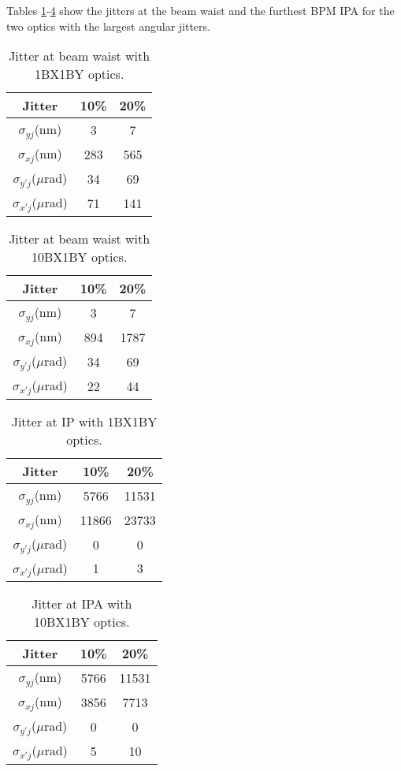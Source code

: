 Tables \ref{t-jitter1BX1BY}-\ref{t-jitter10BX1BY-IPA} show the jitters at the beam waist and the furthest BPM IPA for the two optics with the largest angular jitters.\par
\begin{table}[hbt]
\centering
 \begin{tabular}{|c|c|c|}\hline	
 Jitter &10\% & 20\%\\\hline
 $\sigma_{yj}$(nm) & 3  & 7\\\hline
 $\sigma_{xj}$(nm) &283&565 \\\hline
 $\sigma_{y'j}$($\mu$rad) &34&69\\\hline
 $\sigma_{x'j}$($\mu$rad) &71&141\\\hline
 \end{tabular}
 \caption{Jitter at beam waist with 1BX1BY optics.}\label{t-jitter1BX1BY}
\end{table}
\begin{table}[hbt]
\centering
 \begin{tabular}{|c|c|c|}\hline
 Jitter &10\% & 20\%\\\hline
 $\sigma_{yj}$(nm) & 3  & 7\\\hline
 $\sigma_{xj}$(nm) &894&1787 \\\hline
 $\sigma_{y'j}$($\mu$rad) &34&69\\\hline
 $\sigma_{x'j}$($\mu$rad) &22&44\\\hline
 \end{tabular}
 \caption{Jitter at beam waist with 10BX1BY optics.}\label{t-jitter10BX1BY}
\end{table}
\begin{table}[hbt]
\centering
 \begin{tabular}{|c|c|c|}\hline
 Jitter &10\% & 20\%\\\hline
 $\sigma_{yj}$(nm) & 5766  &11531\\\hline
 $\sigma_{xj}$(nm) &11866&23733 \\\hline
 $\sigma_{y'j}$($\mu$rad) &0&0\\\hline
 $\sigma_{x'j}$($\mu$rad) &1&3\\\hline
 \end{tabular}
 \caption{Jitter at IP with 1BX1BY optics.}\label{t-jitter1BX1BY-IPA}
\end{table}
\begin{table}[hbt]
\centering
 \begin{tabular}{|c|c|c|}\hline
 Jitter &10\% & 20\%\\\hline
 $\sigma_{yj}$(nm) &5766&11531\\\hline
 $\sigma_{xj}$(nm) &3856&7713\\\hline
 $\sigma_{y'j}$($\mu$rad) &0&0\\\hline
 $\sigma_{x'j}$($\mu$rad) &5&10\\\hline
 \end{tabular}
 \caption{Jitter at IPA with 10BX1BY optics.}\label{t-jitter10BX1BY-IPA}
\end{table}
